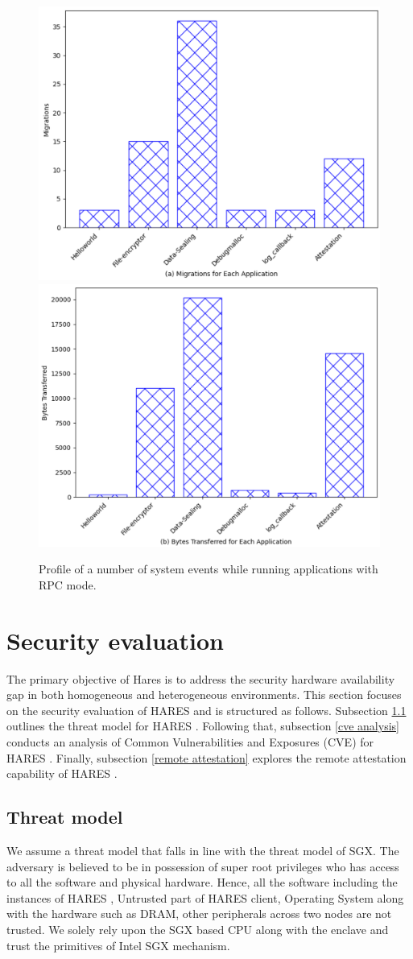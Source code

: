 \documentclass[article, doublespace,nopageskip]{VTthesis} %
\newcommand{\monitor}{HARES }
\begin{document}
    \begin{figure}[htp]
    \centering
    \includegraphics[width=.50\textwidth]{figures/a-migrations_rpc.png}%
    \hfill
    \includegraphics[width=.50\textwidth]{figures/b-bytes_transferred_rpc.png}%
    \caption{Profile of a number of system events while running applications with RPC mode.}
    \label{fig:profile_rpc}
    \end{figure}

    
    \section{Security evaluation} \label{sse:Security evaluation}
    The primary objective of Hares is to address the security hardware availability gap in both homogeneous and heterogeneous environments. This section focuses on the security evaluation of \monitor and is structured as follows. Subsection \ref{ase:threat model} outlines the threat model for \monitor. Following that, subsection \ref{cve analysis} conducts an analysis of Common Vulnerabilities and Exposures (CVE) for \monitor. Finally, subsection \ref{remote attestation} explores the remote attestation capability of \monitor. 
    
    \subsection{Threat model} \label{ase:threat model}
    We assume a threat model that falls in line with the threat model of SGX. The adversary is believed to be in possession of super root privileges who has access to all the software and physical hardware. Hence, all the software including the instances of \monitor, Untrusted part of \monitor client, Operating System along with the hardware such as DRAM, other peripherals across two nodes are not trusted. We solely rely upon the SGX based CPU along with the enclave and trust the primitives of Intel SGX mechanism.
\end{document}

